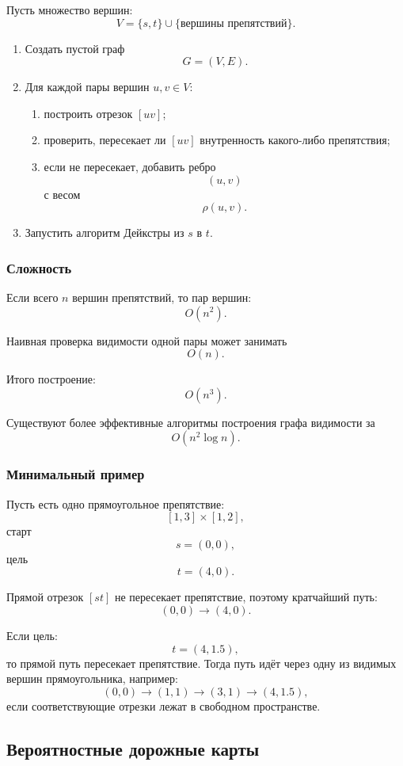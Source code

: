 \documentclass[12pt,a4paper]{article}
\begin{document}
Пусть множество вершин:
\[
V=\{s,t\}\cup\{\text{вершины препятствий}\}.
\]

\begin{enumerate}
    \item Создать пустой граф
    \[
    G=(V,E).
    \]
    \item Для каждой пары вершин \(u,v\in V\):
    \begin{enumerate}
        \item построить отрезок \([uv]\);
        \item проверить, пересекает ли \([uv]\) внутренность какого-либо препятствия;
        \item если не пересекает, добавить ребро
        \[
        (u,v)
        \]
        с весом
        \[
        \rho(u,v).
        \]
    \end{enumerate}
    \item Запустить алгоритм Дейкстры из \(s\) в \(t\).
\end{enumerate}

\subsubsection{Сложность}

Если всего \(n\) вершин препятствий, то пар вершин:
\[
O(n^2).
\]

Наивная проверка видимости одной пары может занимать
\[
O(n).
\]

Итого построение:
\[
O(n^3).
\]

Существуют более эффективные алгоритмы построения графа видимости за
\[
O(n^2\log n).
\]

\subsubsection{Минимальный пример}

Пусть есть одно прямоугольное препятствие:
\[
[1,3]\times[1,2],
\]
старт
\[
s=(0,0),
\]
цель
\[
t=(4,0).
\]

Прямой отрезок \([st]\) не пересекает препятствие, поэтому кратчайший путь:
\[
(0,0)\to(4,0).
\]

Если цель:
\[
t=(4,1.5),
\]
то прямой путь пересекает препятствие. Тогда путь идёт через одну из видимых вершин прямоугольника, например:
\[
(0,0)\to(1,1)\to(3,1)\to(4,1.5),
\]
если соответствующие отрезки лежат в свободном пространстве.

\subsection{Вероятностные дорожные карты}
\end{document}
